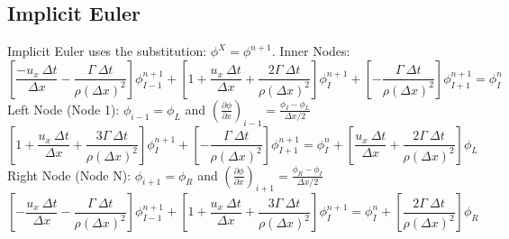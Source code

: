 \documentclass[12pt]{article}
\begin{document}
\subsection{Implicit Euler}
Implicit Euler uses the substitution: $\phi^{X} = \phi^{n+1}$.
Inner Nodes:
\begin{equation}
    \left[ \frac{-u_x\: \Delta t}{\Delta x} - \frac{\Gamma\:\Delta t}{\rho\left(\Delta x\right)^2} \right]\phi_{I-1}^{n+1} + \left[ 1 + \frac{u_x\: \Delta t}{\Delta x} + \frac{2\Gamma\: \Delta t}{\rho\left(\Delta x\right)^2} \right]\phi_{I}^{n+1} + \left[ -\frac{\Gamma\: \Delta t}{\rho\left(\Delta x\right)^2} \right]\phi_{I+1}^{n+1} = \phi_{I}^{n}
    \label{eq:ie inner}
\end{equation}
Left Node (Node 1): $\phi_{i-1} = \phi_L$ and $\left( \frac{\partial \phi}{\partial x} \right)_{i-1} = \frac{\phi_I - \phi_L}{\Delta x/2}$
\begin{equation}
    \left[ 1 + \frac{u_x\:\Delta t}{\Delta x} + \frac{3\Gamma\:\Delta t}{\rho\left(\Delta x\right)^2} \right]\phi_{I}^{n+1} + \left[ -\frac{\Gamma\:\Delta t}{\rho\left(\Delta x\right)^2} \right]\phi_{I+1}^{n+1} = \phi_{I}^{n} + \left[ \frac{u_x\:\Delta t}{\Delta x} + \frac{2\Gamma\:\Delta t}{\rho\left(\Delta x\right)^2} \right]\phi_{L}
    \label{eq:ie left}
\end{equation}
Right Node (Node N): $\phi_{i+1} = \phi_R$ and $\left( \frac{\partial \phi}{\partial x} \right)_{i+1} = \frac{\phi_R - \phi_I}{\Delta x/2}$
\begin{equation}
    \left[ -\frac{u_x\:\Delta t}{\Delta x} - \frac{\Gamma\:\Delta t}{\rho\left(\Delta x\right)^2} \right]\phi_{I-1}^{n+1} + \left[ 1 + \frac{u_x\:\Delta t}{\Delta x} + \frac{3\Gamma\:\Delta t}{\rho\left(\Delta x\right)^2} \right]\phi_{I}^{n+1} = \phi_{I}^{n} + \left[ \frac{2\Gamma\:\Delta t}{\rho\left(\Delta x\right)^2} \right]\phi_{R}
    \label{eq:ie right}
\end{equation}


\end{document}
